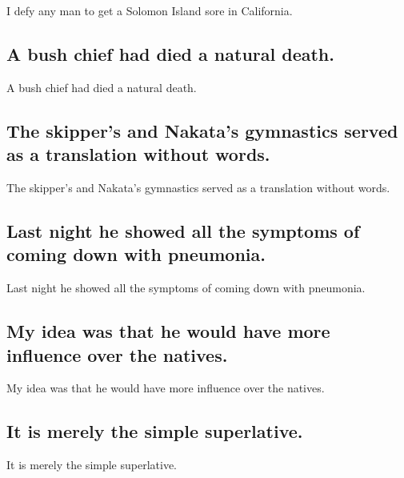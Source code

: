\documentclass[]{article}
\begin{document}
I defy any man to get a Solomon Island sore in California.

\hypertarget{a-bush-chief-had-died-a-natural-death.}{%
\subsection{A bush chief had died a natural
death.}\label{a-bush-chief-had-died-a-natural-death.}}

A bush chief had died a natural death.

\hypertarget{the-skippers-and-nakatas-gymnastics-served-as-a-translation-without-words.}{%
\subsection{The skipper's and Nakata's gymnastics served as a
translation without
words.}\label{the-skippers-and-nakatas-gymnastics-served-as-a-translation-without-words.}}

The skipper's and Nakata's gymnastics served as a translation without
words.

\hypertarget{last-night-he-showed-all-the-symptoms-of-coming-down-with-pneumonia.}{%
\subsection{Last night he showed all the symptoms of coming down with
pneumonia.}\label{last-night-he-showed-all-the-symptoms-of-coming-down-with-pneumonia.}}

Last night he showed all the symptoms of coming down with pneumonia.

\hypertarget{my-idea-was-that-he-would-have-more-influence-over-the-natives.}{%
\subsection{My idea was that he would have more influence over the
natives.}\label{my-idea-was-that-he-would-have-more-influence-over-the-natives.}}

My idea was that he would have more influence over the natives.

\hypertarget{it-is-merely-the-simple-superlative.}{%
\subsection{It is merely the simple
superlative.}\label{it-is-merely-the-simple-superlative.}}

It is merely the simple superlative.
\end{document}

